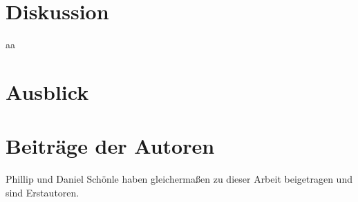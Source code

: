 \section{Diskussion}
aa
\section{Ausblick}

\section{Beiträge der Autoren}
 Phillip und Daniel Schönle haben gleichermaßen zu dieser Arbeit beigetragen und sind Erstautoren.